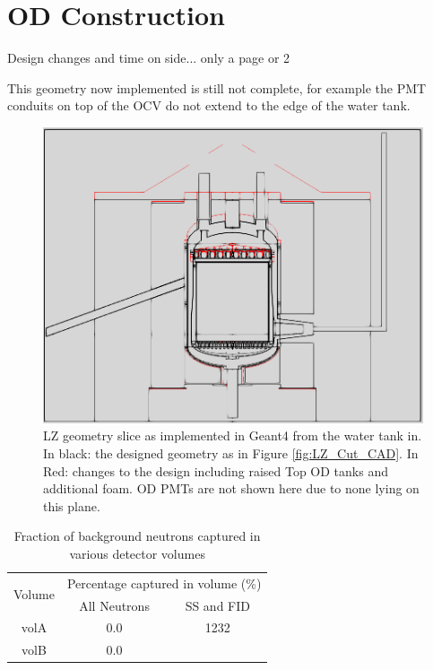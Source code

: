 \section{OD Construction} \label{od_construction_sec}
\par
Design changes and time on side... only a page or 2


\par
This geometry now implemented is still not complete, for example the PMT conduits on top of the OCV do not extend to the edge of the water tank. 

\begin{figure}[!htbp]
\includegraphics[width=\textwidth]{Figures/Construction/geometry_differences.png}
\centering
\caption{LZ geometry slice as implemented in Geant4 from the water tank in. In black: the designed geometry as in Figure \ref{fig:LZ_Cut_CAD}. In Red: changes to the design including raised Top OD tanks and additional foam. OD PMTs are not shown here due to none lying on this plane.}
\label{fig:Geometry_Differences}
\end{figure}


\begin{table}[!htbp]
    \centering
    \begin{tabular}{ c | c | c } 
    \hline
    \multirow{2}{*}{Volume} & \multicolumn{2}{l}{Percentage captured in volume (\%)} \\ 
                            & All Neutrons  & SS and FID  \\ \hline
    volA    & 0.0   & 1232\\
    volB    & 0.0   &
    \end{tabular}
    \caption{Fraction of background neutrons captured in various detector volumes}
    \label{tab:fraction_of_neutrons_captured_in_volumes}
\end{table} 